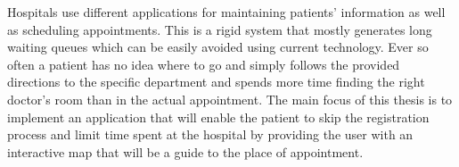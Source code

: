 Hospitals use different applications for maintaining patients' information as well as scheduling appointments.
This is a rigid system that mostly generates long waiting queues which can be easily avoided using current technology.
Ever so often a patient has no idea where to go and simply follows the provided directions to the specific department
and spends more time finding the right doctor's room than in the actual appointment.
The main focus of this thesis is to implement an application that will enable the patient to skip the registration
process and limit time spent at the hospital by providing the user with an interactive map that will be a guide to
the place of appointment.
